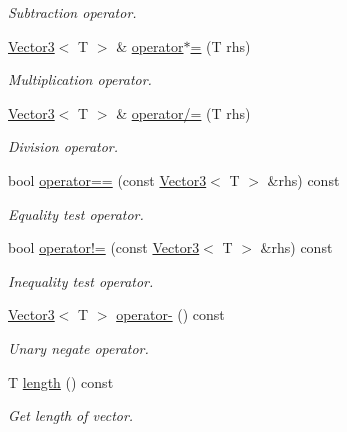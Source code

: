 \begin{DoxyCompactItemize}
\begin{DoxyCompactList}\small\item\em Subtraction operator. \item\end{DoxyCompactList}\item 
\hyperlink{class_vector3}{Vector3}$<$ T $>$ \& \hyperlink{class_vector3_a34e1c1ba70d7cea23639c2e71cd17bd9}{operator$\ast$=} (T rhs)
\begin{DoxyCompactList}\small\item\em Multiplication operator. \item\end{DoxyCompactList}\item 
\hyperlink{class_vector3}{Vector3}$<$ T $>$ \& \hyperlink{class_vector3_ab584b594f28c0bbdea48c973d8725179}{operator/=} (T rhs)
\begin{DoxyCompactList}\small\item\em Division operator. \item\end{DoxyCompactList}\item 
bool \hyperlink{class_vector3_af3335b4d12d144e5d796518e9521936b}{operator==} (const \hyperlink{class_vector3}{Vector3}$<$ T $>$ \&rhs) const 
\begin{DoxyCompactList}\small\item\em Equality test operator. \item\end{DoxyCompactList}\item 
bool \hyperlink{class_vector3_a2b688296e6471b97e1540412a5e6e68c}{operator!=} (const \hyperlink{class_vector3}{Vector3}$<$ T $>$ \&rhs) const 
\begin{DoxyCompactList}\small\item\em Inequality test operator. \item\end{DoxyCompactList}\item 
\hyperlink{class_vector3}{Vector3}$<$ T $>$ \hyperlink{class_vector3_a19ffa959993141f3ad4b249cba47c741}{operator-\/} () const 
\begin{DoxyCompactList}\small\item\em Unary negate operator. \item\end{DoxyCompactList}\item 
T \hyperlink{class_vector3_af8f3e528208b3d7fdae9f40e2841f3bb}{length} () const 
\begin{DoxyCompactList}\small\item\em Get length of vector. \item\end{DoxyCompactList}\item 

\end{DoxyCompactItemize}
